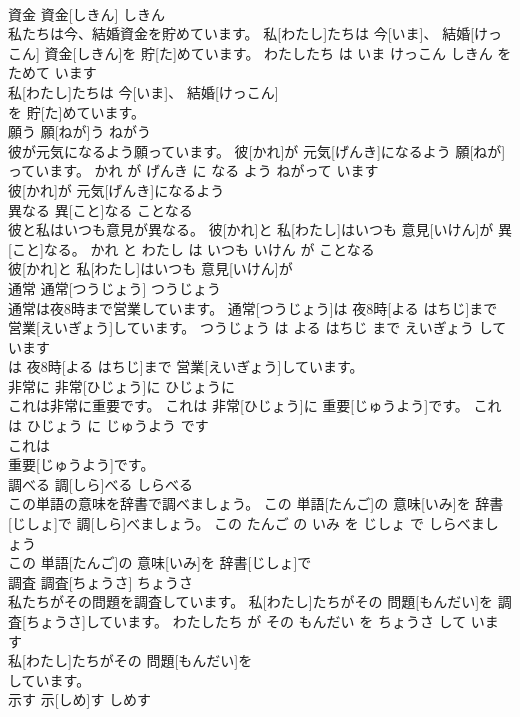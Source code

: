 \documentclass[8pt]{extreport}
\begin{document}
\begin{CJK}{UTF8}{min}
\\	資金	資金[しきん]	しきん	
\\	私たちは今、結婚資金を貯めています。	私[わたし]たちは 今[いま]、 結婚[けっこん] 資金[しきん]を 貯[た]めています。	わたしたち は いま けっこん しきん を ためて います	
\\	私[わたし]たちは 今[いま]、 結婚[けっこん]
\\	を 貯[た]めています。			
\\	願う	願[ねが]う	ねがう	
\\	彼が元気になるよう願っています。	彼[かれ]が 元気[げんき]になるよう 願[ねが]っています。	かれ が げんき に なる よう ねがって います	
\\	彼[かれ]が 元気[げんき]になるよう
\\	異なる	異[こと]なる	ことなる	
\\	彼と私はいつも意見が異なる。	彼[かれ]と 私[わたし]はいつも 意見[いけん]が 異[こと]なる。	かれ と わたし は いつも いけん が ことなる	
\\	彼[かれ]と 私[わたし]はいつも 意見[いけん]が
\\	通常	通常[つうじょう]	つうじょう	
\\	通常は夜8時まで営業しています。	通常[つうじょう]は 夜8時[よる はちじ]まで 営業[えいぎょう]しています。	つうじょう は よる はちじ まで えいぎょう して います	
\\	は 夜8時[よる はちじ]まで 営業[えいぎょう]しています。			
\\	非常に	非常[ひじょう]に	ひじょうに	
\\	これは非常に重要です。	これは 非常[ひじょう]に 重要[じゅうよう]です。	これ は ひじょう に じゅうよう です	
\\	これは
\\	重要[じゅうよう]です。			
\\	調べる	調[しら]べる	しらべる	
\\	この単語の意味を辞書で調べましょう。	この 単語[たんご]の 意味[いみ]を 辞書[じしょ]で 調[しら]べましょう。	この たんご の いみ を じしょ で しらべましょう	
\\	この 単語[たんご]の 意味[いみ]を 辞書[じしょ]で
\\	調査	調査[ちょうさ]	ちょうさ	
\\	私たちがその問題を調査しています。	私[わたし]たちがその 問題[もんだい]を 調査[ちょうさ]しています。	わたしたち が その もんだい を ちょうさ して います	
\\	私[わたし]たちがその 問題[もんだい]を
\\	しています。			
\\	示す	示[しめ]す	しめす	

\end{CJK}
\end{document}

